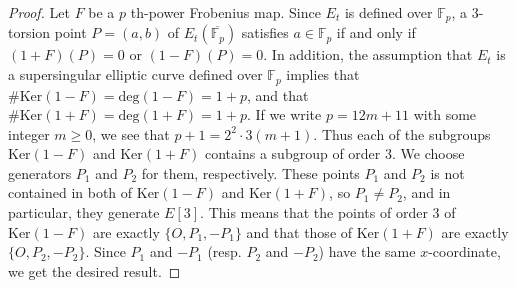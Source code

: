 \documentclass[a4paper, 11pt]{article}
\theoremstyle{plain}
\newcommand{\?}{\textcolor{red}{??}}
\newcommand{\fp}{\mathbb{F}_p}
\begin{document}
\begin{proof}
    Let $F$ be a $p$ th-power Frobenius map. Since $E_t$ is defined over $\fp$, a $3$-torsion point $P=(a,b)$ of $E_t(\overline{\fp})$ satisfies $a\in \fp$ if and only if $(1+F)(P)=0$ or $(1-F)(P)=0$. In addition, the assumption that $E_t$ is a supersingular elliptic curve defined over $\fp$ implies that  $\#\textrm{Ker}(1-F)=\textrm{deg}(1-F)=1+p$, and that $\#\textrm{Ker}(1+F)=\textrm{deg}(1+F)=1+p$. If we write $p=12m+11$ with some integer $m\ge 0$, we see that $p+1=2^2\cdot3(m+1)$. Thus each of the subgroups $\textrm{Ker}(1-F)$ and  $\textrm{Ker}(1+F)$ contains a subgroup of order $3$. We choose generators $P_1$ and $P_2$ for them, respectively. These points $P_1$ and $P_2$ is not contained in both of $\textrm{Ker}(1-F)$ and $\textrm{Ker}(1+F) $, so $P_1 \ne P_2$, and in particular, they generate $E[3]$. This means that the points of order $3$ of $\textrm{Ker}(1-F) $ are exactly $\{O,P_1,-P_1\}$ and that those of $\textrm{Ker}(1+F) $ are exactly $\{O,P_2,-P_2\}$. Since $P_1$ and $-P_1$ (resp. $P_2$ and $-P_2$) have the same $x$-coordinate, we get the desired result.  
\end{proof}
\end{document}

